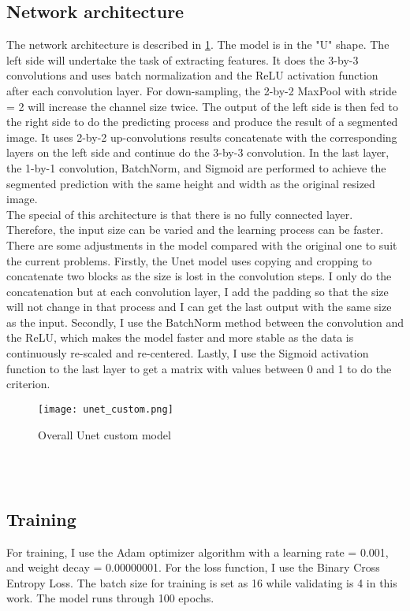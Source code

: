 \documentclass[conference]{article}
\begin{document}
\subsection{Network architecture} The network architecture is described in \ref{fig:Unet}. The model is in the "U" shape. The left side will undertake the task of extracting features. It does the 3-by-3 convolutions and uses batch normalization and the ReLU activation function after each convolution layer. For down-sampling, the 2-by-2 MaxPool with stride = 2 will increase the channel size twice. The output of the left side is then fed to the right side to do the predicting process and produce the result of a segmented image. It uses 2-by-2 up-convolutions results concatenate with the corresponding layers on the left side and continue do the 3-by-3 convolution. In the last layer, the 1-by-1 convolution, BatchNorm, and Sigmoid are performed to achieve the segmented prediction with the same height and width as the original resized image.\\ 
The special of this architecture is that there is no fully connected layer. Therefore, the input size can be varied and the learning process can be faster.\\
There are some adjustments in the model compared with the original one to suit the current problems. Firstly, the Unet model uses copying and cropping to concatenate two blocks as the size is lost in the convolution steps. I only do the concatenation but at each convolution layer, I add the padding so that the size will not change in that process and I can get the last output with the same size as the input. Secondly, I use the BatchNorm method between the convolution and the ReLU, which makes the model faster and more stable as the data is continuously re-scaled and re-centered. Lastly, I use the Sigmoid activation function to the last layer to get a matrix with values between 0 and 1 to do the criterion.
\begin{figure}
    \centering
    \texttt{[image: unet\_custom.png]}
    \caption{Overall Unet custom model}
    \label{fig:Unet}
\end{figure}
\mbox{}\\\\

\subsection{Training}
For training, I use the Adam optimizer algorithm with a learning rate = 0.001, and weight decay = 0.00000001. For the loss function, I use the Binary Cross Entropy Loss. The batch size for training is set as 16 while validating is 4 in this work. The model runs through 100 epochs.
\end{document}
